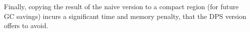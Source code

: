 \documentclass[english]{jflart}
\begin{document}
Finally, copying the result of the naive version to a compact region (for future GC savings) incurs a significant time and memory penalty, that the DPS version offers to avoid.







\end{document}
